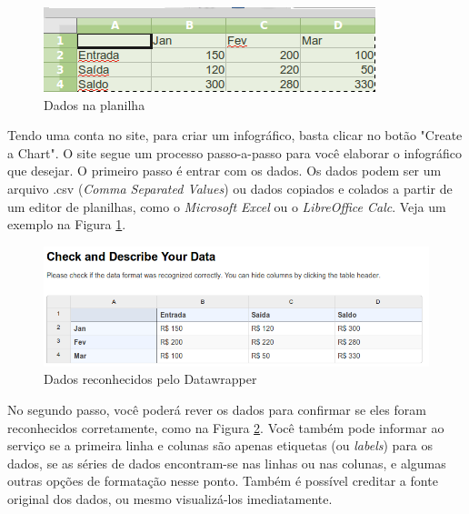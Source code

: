 \documentclass[12pt,onecolumn]{article}
\begin{document}
    \begin{figure}[H]
      \begin{center}
        \includegraphics[scale=0.5]{dados-calc.png}
        \caption{Dados na planilha}
        \label{fig:dados-calc}
      \end{center}
    \end{figure}
    
    Tendo uma conta no site, para criar um infográfico, basta clicar no botão 
    "Create a Chart". O site segue um processo passo-a-passo para você elaborar
    o infográfico que desejar. O primeiro passo é entrar com os dados. Os dados
    podem ser um arquivo .csv (\emph{Comma Separated Values}) ou dados copiados
    e colados a partir de um editor de planilhas, como o \emph{Microsoft Excel}
    ou o \emph{LibreOffice Calc}. Veja um exemplo na Figura \ref{fig:dados-calc}.
    
    
    \begin{figure}[H]
      \begin{center}
        \includegraphics[scale = 0.5]{datawrapper-data.png}
        \caption{Dados reconhecidos pelo Datawrapper}
        \label{fig:datawrapper-data}
      \end{center}
    \end{figure}
    
    No segundo passo, você poderá rever os dados para confirmar se eles foram
    reconhecidos corretamente, como na Figura \ref{fig:datawrapper-data}. Você
    também pode informar ao serviço se a primeira linha e colunas são apenas
    etiquetas (ou \emph{labels}) para os dados, se as séries de dados
    encontram-se nas linhas ou nas colunas, e algumas outras opções de
    formatação nesse ponto. Também é possível creditar a fonte original dos
    dados, ou mesmo visualizá-los imediatamente.
    
\end{document}
